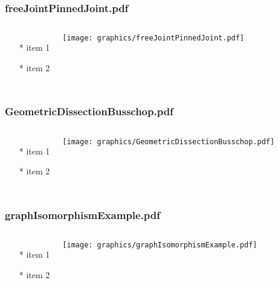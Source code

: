 \documentclass{beamer}
\begin{document}
\begin{frame} \frametitle{freeJointPinnedJoint.pdf}
    \begin{columns}[c]
        \begin{itemize}
            \item[*] item 1
            \item[*] item 2
        \end{itemize}
        \begin{minipage}{\linewidth}
            \begin{center}
            \texttt{[image: graphics/freeJointPinnedJoint.pdf]}
            \label{gfx:freeJointPinnedJoint.pdf}
            \end{center}
        \end{minipage}
    \end{columns}
\end{frame}
\begin{frame} \frametitle{GeometricDissectionBusschop.pdf}
    \begin{columns}[c]
        \begin{itemize}
            \item[*] item 1
            \item[*] item 2
        \end{itemize}
        \begin{minipage}{\linewidth}
            \begin{center}
            \texttt{[image: graphics/GeometricDissectionBusschop.pdf]}
            \label{gfx:GeometricDissectionBusschop.pdf}
            \end{center}
        \end{minipage}
    \end{columns}
\end{frame}
\begin{frame} \frametitle{graphIsomorphismExample.pdf}
    \begin{columns}[c]
        \begin{itemize}
            \item[*] item 1
            \item[*] item 2
        \end{itemize}
        \begin{minipage}{\linewidth}
            \begin{center}
            \texttt{[image: graphics/graphIsomorphismExample.pdf]}
            \label{gfx:graphIsomorphismExample.pdf}
            \end{center}
        \end{minipage}
    \end{columns}
\end{frame}
\end{document}

